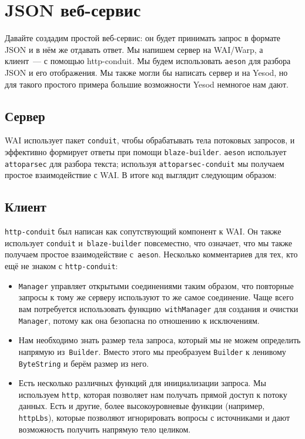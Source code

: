 \chapter {JSON веб-сервис}\label{chap:json_web_service}

Давайте создадим простой веб-сервис: он будет принимать запрос в формате JSON и
в нём же отдавать ответ. Мы напишем сервер на WAI/Warp, а клиент~--- с помощью
{http-conduit}. Мы будем использовать \texttt{aeson} для разбора JSON и его
отображения. Мы также могли бы написать сервер и на Yesod, но для такого
простого примера большие возможности Yesod немногое нам дают.

\section {Сервер}

WAI использует пакет \texttt{conduit}, чтобы обрабатывать тела потоковых
запросов, и эффективно формирует ответы при помощи \texttt{blaze-builder}.
\texttt{aeson} использует \texttt{attoparsec} для разбора текста; используя
\texttt{attoparsec-conduit} мы получаем простое взаимодействие с WAI. В итоге
код выглядит следующим образом:


\section {Клиент}

\texttt{http-conduit} был написан как сопутствующий компонент к WAI. Он также
использует \texttt{conduit} и~\texttt{blaze-builder} повсеместно, что означает,
что мы также получаем простое взаимодействие с~\texttt{aeson}. Несколько
комментариев для тех, кто ещё не знаком с \texttt{http-conduit}:

\begin{itemize}
  \item \lstinline'Manager' управляет открытыми соединениями таким образом, что
      повторные запросы к тому же серверу используют то же самое соединение.
      Чаще всего вам потребуется использовать функцию~\lstinline'withManager'
      для создания и очистки \lstinline!Manager!, потому как она безопасна по
      отношению к исключениям.

  \item Нам необходимо знать размер тела запроса, который мы не можем
      определить напрямую из~\lstinline'Builder'. Вместо этого мы преобразуем
      \lstinline'Builder' к ленивому \lstinline'ByteString' и берём размер из
      него.

  \item Есть несколько различных функций для инициализации запроса. Мы
      используем \lstinline'http', которая позволяет нам получать прямой доступ
      к потоку данных. Есть и другие, более высокоуровневые функции (например,
      \lstinline'httpLbs'), которые позволяют игнорировать вопросы с
      источниками и дают возможность получить напрямую тело целиком.
\end{itemize}

